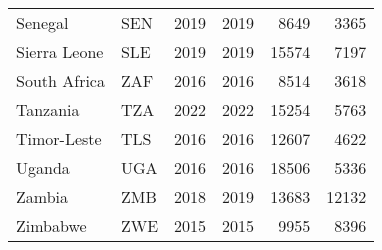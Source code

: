 \begin{table}[ht]
\begin{tabular}{llrrrr}
  Senegal & SEN & 2019 & 2019 & 8649 & 3365 \\ 
  Sierra Leone & SLE & 2019 & 2019 & 15574 & 7197 \\ 
  South Africa & ZAF & 2016 & 2016 & 8514 & 3618 \\ 
  Tanzania & TZA & 2022 & 2022 & 15254 & 5763 \\ 
  Timor-Leste & TLS & 2016 & 2016 & 12607 & 4622 \\ 
  Uganda & UGA & 2016 & 2016 & 18506 & 5336 \\ 
  Zambia & ZMB & 2018 & 2019 & 13683 & 12132 \\ 
  Zimbabwe & ZWE & 2015 & 2015 & 9955 & 8396 \\ 
   \hline
\end{tabular}
\end{table}
